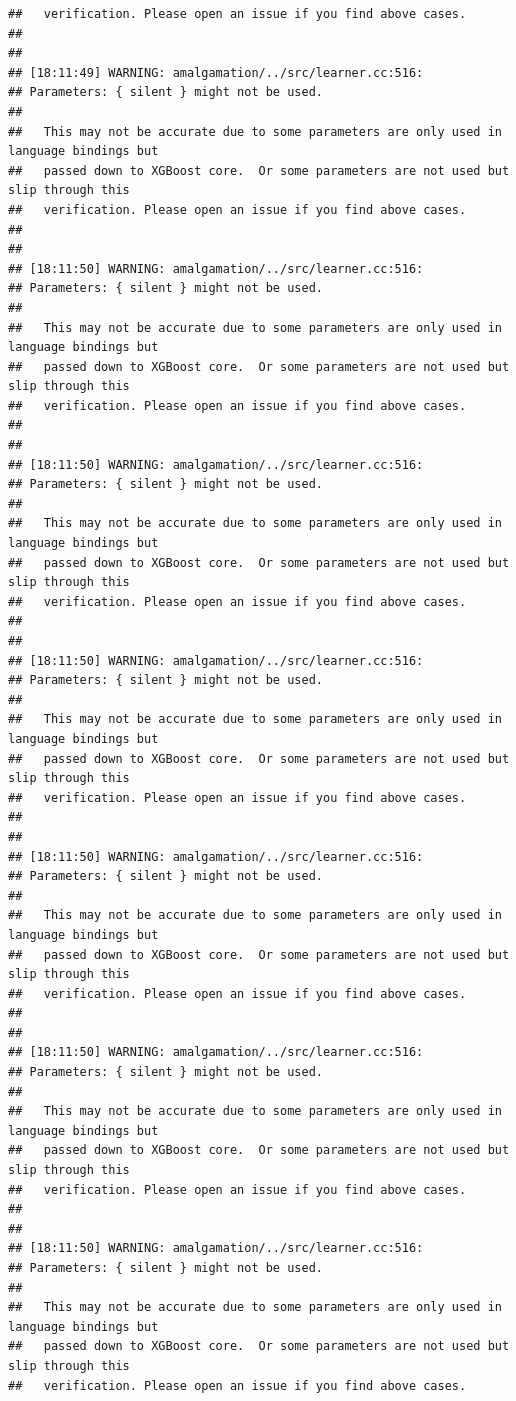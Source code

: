 \documentclass[AMS,STIX2COL]{WileyNJD-v2}\usepackage[]{graphicx}\usepackage[]{color}
\makeatletter
\newenvironment{kframe}{%
 \def\at@end@of@kframe{}%
 \ifinner\ifhmode%
  \def\at@end@of@kframe{\end{minipage}}%
  \begin{minipage}{\columnwidth}%
 \fi\fi%
 \def\FrameCommand##1{\hskip\@totalleftmargin \hskip-\fboxsep
 \colorbox{shadecolor}{##1}\hskip-\fboxsep
     \hskip-\linewidth \hskip-\@totalleftmargin \hskip\columnwidth}%
 \MakeFramed {\advance\hsize-\width
   \@totalleftmargin\z@ \linewidth\hsize
   \@setminipage}}%
 {\par\unskip\endMakeFramed%
 \at@end@of@kframe}
\newenvironment{knitrout}{}{} %
\makeatother
\begin{document}
\begin{knitrout}
\begin{kframe}
\begin{verbatim}
##   verification. Please open an issue if you find above cases.
## 
## 
## [18:11:49] WARNING: amalgamation/../src/learner.cc:516: 
## Parameters: { silent } might not be used.
## 
##   This may not be accurate due to some parameters are only used in language bindings but
##   passed down to XGBoost core.  Or some parameters are not used but slip through this
##   verification. Please open an issue if you find above cases.
## 
## 
## [18:11:50] WARNING: amalgamation/../src/learner.cc:516: 
## Parameters: { silent } might not be used.
## 
##   This may not be accurate due to some parameters are only used in language bindings but
##   passed down to XGBoost core.  Or some parameters are not used but slip through this
##   verification. Please open an issue if you find above cases.
## 
## 
## [18:11:50] WARNING: amalgamation/../src/learner.cc:516: 
## Parameters: { silent } might not be used.
## 
##   This may not be accurate due to some parameters are only used in language bindings but
##   passed down to XGBoost core.  Or some parameters are not used but slip through this
##   verification. Please open an issue if you find above cases.
## 
## 
## [18:11:50] WARNING: amalgamation/../src/learner.cc:516: 
## Parameters: { silent } might not be used.
## 
##   This may not be accurate due to some parameters are only used in language bindings but
##   passed down to XGBoost core.  Or some parameters are not used but slip through this
##   verification. Please open an issue if you find above cases.
## 
## 
## [18:11:50] WARNING: amalgamation/../src/learner.cc:516: 
## Parameters: { silent } might not be used.
## 
##   This may not be accurate due to some parameters are only used in language bindings but
##   passed down to XGBoost core.  Or some parameters are not used but slip through this
##   verification. Please open an issue if you find above cases.
## 
## 
## [18:11:50] WARNING: amalgamation/../src/learner.cc:516: 
## Parameters: { silent } might not be used.
## 
##   This may not be accurate due to some parameters are only used in language bindings but
##   passed down to XGBoost core.  Or some parameters are not used but slip through this
##   verification. Please open an issue if you find above cases.
## 
## 
## [18:11:50] WARNING: amalgamation/../src/learner.cc:516: 
## Parameters: { silent } might not be used.
## 
##   This may not be accurate due to some parameters are only used in language bindings but
##   passed down to XGBoost core.  Or some parameters are not used but slip through this
##   verification. Please open an issue if you find above cases.

\end{verbatim}
\end{kframe}
\end{knitrout}
\end{document}
